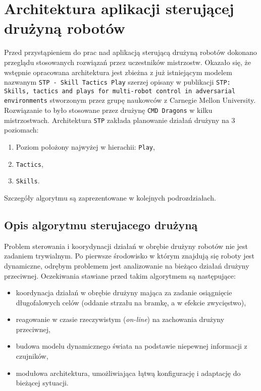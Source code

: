 \chapter{Architektura aplikacji sterującej drużyną robotów \label{chap:stp}}
Przed przystąpieniem do prac nad aplikacją sterującą drużyną robotów dokonano przeglądu stosowanych rozwiązań przez uczestników mistrzostw. Okazało się, że wstępnie opracowana
architektura jest zbieżna z już istniejącym modelem nazwanym \mbox{\texttt{STP - Skill Tactics Play}} szerzej opisany w publikacji \texttt{STP: Skills, tactics and plays for multi-robot
control in adversarial environments} \cite{stp} stworzonym przez grupę naukowców z Carnegie Mellon University. Rozwiązanie to było stosowane przez drużynę \texttt{CMD Dragons} w kilku mistrzostwach.
Architektura \texttt{STP} zakłada planowanie działań drużyny na 3 poziomach:
\begin{enumerate}
 \item Poziom położony najwyżej w hierachii: \texttt{Play},
 \item \texttt{Tactics},
 \item \texttt{Skills}.
\end{enumerate}
Szczegóły algorytmu są zaprezentowane w kolejnych podrozdziałach.
\section{Opis algorytmu sterujacego drużyną}
Problem sterowania i koorydynacji działań w obrębie drużyny robotów nie jest zadaniem trywialnym. Po pierwsze środowisko w którym znajdują się roboty jest dynamiczne,
odrębym problemem jest analizowanie na bieżąco działań drużyny przeciwnej. Oczekiwania stawiane przed takim algorytmem są następujące:
\begin{itemize}
 \item koordynacja działań w obrębie drużyny mająca za zadanie osiągnięcie długofalowych celów (oddanie strzału na bramkę, a w efekcie zwycięstwo),
 \item reagowanie w czasie rzeczywistym (\textit{on-line}) na zachowania drużyny przeciwnej,
 \item budowa modelu dynamicznego świata na podstawie niepewnej informacji z czujników,
 \item modułowa architektura, umożliwiająca łątwą konfigurację i adaptację do bieżącej sytuacji.
\end{itemize}

